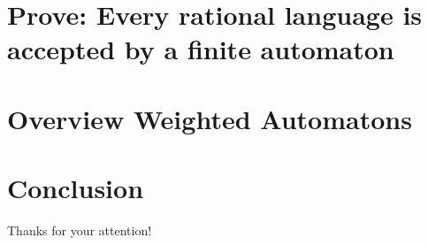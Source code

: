 \documentclass{beamer}
\begin{document}
\section{Prove: Every rational language is accepted by a finite automaton}
\section{Overview Weighted Automatons}
\section{Conclusion}




\begin{frame}
    \Huge{\centerline{Thanks for your attention!}}
    
\end{frame}





\end{document}

